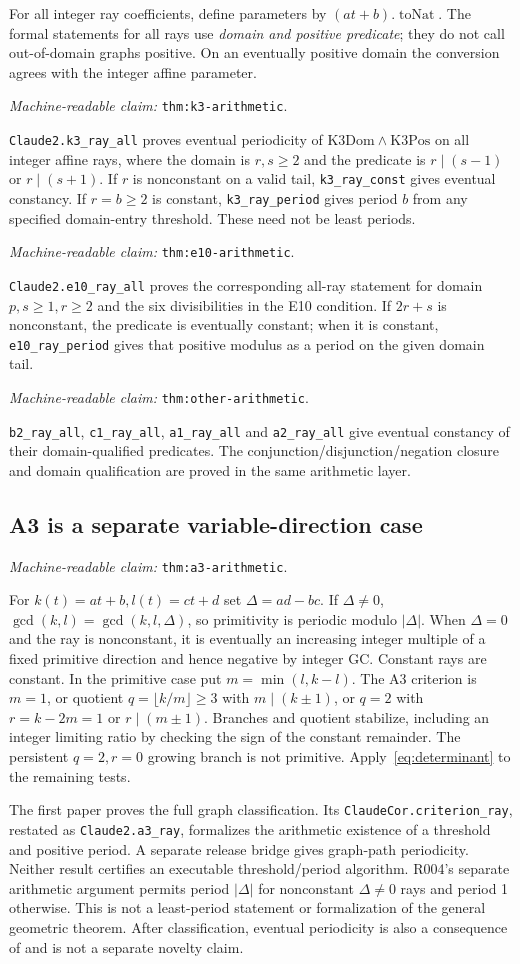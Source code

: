 \documentclass[11pt]{amsart}
\newcommand{\record}[1]{\nolinkurl{#1}}
\newcommand{\claimid}[1]{\par\nopagebreak\noindent\textit{Machine-readable claim:} \record{#1}.\par}
\theoremstyle{definition}\newtheorem{definition}{Definition}
\begin{document}
For all integer ray coefficients, define parameters by
$(at+b).\operatorname{toNat}$. The formal statements for all rays use
\emph{domain and positive predicate}; they do not call out-of-domain
graphs positive. On an eventually positive domain the conversion
agrees with the integer affine parameter.
\label{thm:k3-arithmetic}\claimid{thm:k3-arithmetic}
\record{Claude2.k3_ray_all} proves eventual periodicity of
$\mathrm{K3Dom}\wedge\mathrm{K3Pos}$ on all integer affine rays,
where the domain is $r,s\ge2$ and the predicate is
$r\mid(s-1)$ or $r\mid(s+1)$. If $r$ is nonconstant on a valid tail,
\record{k3_ray_const} gives eventual constancy. If $r=b\ge2$ is
constant, \record{k3_ray_period} gives period $b$ from any specified
domain-entry threshold. These need not be least periods.
\label{thm:e10-arithmetic}\claimid{thm:e10-arithmetic}
\record{Claude2.e10_ray_all} proves the corresponding all-ray statement
for domain $p,s\ge1,r\ge2$ and the six divisibilities in the E10
condition. If $2r+s$ is nonconstant, the predicate is eventually
constant; when it is constant, \record{e10_ray_period} gives that
positive modulus as a period on the given domain tail.
\label{thm:other-arithmetic}\claimid{thm:other-arithmetic}
\record{b2_ray_all}, \record{c1_ray_all}, \record{a1_ray_all} and
\record{a2_ray_all} give eventual constancy of their domain-qualified
predicates. The conjunction/disjunction/negation closure and domain
qualification are proved in the same arithmetic layer.

\subsection{A3 is a separate variable-direction case}\label{thm:a3-arithmetic}
\claimid{thm:a3-arithmetic}
For $k(t)=at+b,l(t)=ct+d$ set $\Delta=ad-bc$. If $\Delta\ne0$,
$\gcd(k,l)=\gcd(k,l,\Delta)$, so primitivity is periodic modulo
$|\Delta|$. When $\Delta=0$ and the ray is nonconstant, it is
eventually an increasing integer multiple of a fixed primitive
direction and hence negative by integer GC. Constant rays are constant.
In the primitive case put $m=\min(l,k-l)$. The A3 criterion is
$m=1$, or quotient $q=\lfloor k/m\rfloor\ge3$ with $m\mid(k\pm1)$,
or $q=2$ with $r=k-2m=1$ or $r\mid(m\pm1)$. Branches and quotient
stabilize, including an integer limiting ratio by checking the sign
of the constant remainder. The persistent $q=2,r=0$ growing branch
is not primitive. Apply~\eqref{eq:determinant} to the remaining tests.

The first paper proves the full graph classification. Its
\record{ClaudeCor.criterion_ray}, restated as \record{Claude2.a3_ray},
formalizes the arithmetic existence of a threshold and positive
period. A separate release bridge gives graph-path periodicity.
Neither result certifies an executable threshold/period algorithm.
R004's separate arithmetic argument permits period $|\Delta|$ for
nonconstant $\Delta\ne0$ rays and period 1 otherwise. This is not a
least-period statement or formalization of the general geometric
theorem. After classification, eventual periodicity is also a
consequence of \cite[Theorem 1.15]{BGW} and is not a separate novelty claim.
\end{document}
